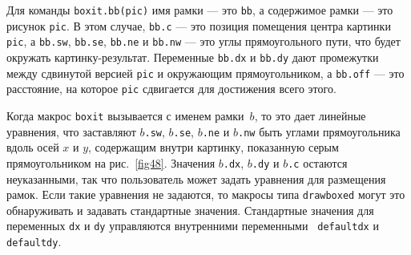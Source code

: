 \documentclass{article} %
\begin{document}
Для команды {\tt boxit.bb(pic)} имя рамки --- это {\tt bb}, а 
содержимое рамки --- это рисунок {\tt pic}.
В этом случае, {\tt bb.c} --- это позиция помещения центра картинки {\tt pic}, 
а {\tt bb.sw}, {\tt bb.se}, {\tt bb.ne} и {\tt bb.nw} --- это углы 
прямоугольного пути, что будет окружать картинку-результат.
Переменные {\tt bb.dx} и {\tt bb.dy} дают промежутки между сдвинутой 
версией {\tt pic} и окружающим прямоугольником, а {\tt bb.off} --- 
это расстояние, на которое {\tt pic} сдвигается для достижения всего 
этого. 

Когда макрос {\tt boxit} вызывается с именем рамки~$b$, то это дает 
линейные уравнения, что заставляют $b${\tt.sw}, $b${\tt.se}, $b${\tt.ne} 
и  $b${\tt.nw} быть углами прямоугольника вдоль осей $x$ и $y$,
содержащим внутри картинку, показанную серым прямоугольником на 
рис.~\ref{fig48}. 
Значения $b${\tt.dx}, $b${\tt.dy} и $b${\tt.c} остаются неуказанными, так что 
пользователь может задать уравнения для размещения рамок.
Если такие уравнения не задаются, то макросы типа {\tt drawboxed} могут 
это обнаруживать и задавать стандартные значения.
Стандартные значения для переменных {\tt dx} и {\tt dy} управляются 
внутренними переменными {\tt
defaultdx}\label{Ddefaultdx} и 
{\tt defaultdy}\label{Ddefaultdy}.
\end{document}
